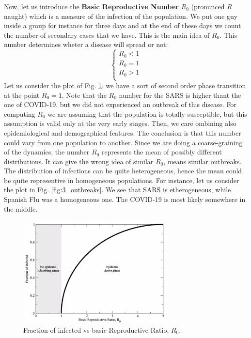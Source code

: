 \documentclass[../main/main.tex]{subfiles}
\begin{document}
Now, let us introduce the \textbf{Basic Reproductive Number} \( R_0 \) (pronunced \( R \) naught) which is a measure of the infection of the population. We put one guy inside a group for instance for three days and at the end of these days we count the number of secondary cases that we have. This is the main idea of \( R_0 \). This number determines wheter a disease will spread or not:
  \begin{equation}
    \begin{cases}
     R_0 < 1\\
     R_0 = 1\\
     R_0 > 1\\
    \end{cases}
  \end{equation}
Let us consider the plot of Fig. \ref{fig:2_R_0.png}, we have a sort of second order phase transition at the point \( R_0=1 \).
Note that the \( R_0 \) number for the SARS is higher thant the one of COVID-19, but we did not experienced an outbreak of this disease.
For computing \( R_0 \) we are assuming that the population is totally susceptible, but this assumption is valid only at the very early stages. Then, we care ombining also epidemiological and demographical features. The conclusion is that this number could vary from one population to another.
Since we are doing a coarse-graining of the dynamics, the number \( R_0 \) represents the mean of possibly different distributions. It can give the wrong idea of similar \( R_0 \), means similar outbreaks.
The distribution of infections can be quite heterogeneous, hence the mean could be quite representive in homogeneous populations. For instance, let us consider the plot in Fig. \ref{fig:3_outbreaks}. We see that SARS is etherogeneous, while Spanish Flu was a homogeneous one.
The COVID-19 is most likely somewhere in the middle.

\begin{figure}[h!]
\centering
\includegraphics[width=0.7\textwidth]{../lessons/image/02/2_R_0.png}
\caption{\label{fig:2_R_0.png} Fraction of infected vs basic Reproductive Ratio, \( R_0 \).}
\end{figure}
\end{document}
